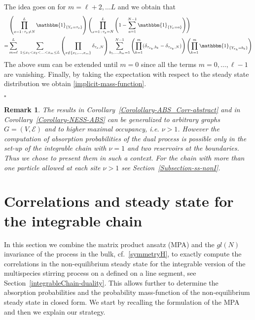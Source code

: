\documentclass[10pt]{article}
\numberwithin{equation}{section}
\numberwithin{equation}{subsection}
\newtheorem{remark}{Remark}
\begin{document}
{	The idea goes on for $m=\ell+2,\ldots L$ and we obtain that 
\begin{align}
&\left(\prod_{x=1\,:\,\tau_{x}\neq N}^{L}\mathbbm{1}_{\{Y_x=\tau_{x}\}}\right)\left(\prod_{x=1\,:\,\tau_{x}=N}^{L}\left(1-\sum_{a=1}^{N-1}\mathbbm{1}_{\{Y_x=a\}}\right)\right)\nonumber\\
=&
\sum_{m=\ell}^{L}\;\sum_{1\leq x_{1}<x_{2}<\ldots<x_{m}\leq L}\left(\prod_{x\notin\{x_{1},\ldots,x_{m}\}}\delta_{\tau_{x},N}\right)\sum_{b_{1},\ldots,b_{m}=1}^{N-1}\left(\prod_{k=1}^{m}(\delta_{\tau_{x_{k}},b_{k}}-\delta_{\tau_{x_{k}},N})\right)\left(\prod_{k=1}^{m}\mathbbm{1}_{\{Y_{x_{k}}=b_{k}\}}\right)
\end{align}
The above sum can be extended until $m=0$ since all the terms $m=0,\ldots,\ell-1$ are vanishing. 
Finally, by taking the expectation with respect to the steady state distribution we obtain \eqref{implicit-mass-function}.}  %
\begin{flushright}
	$\square$
\end{flushright}
\begin{remark}\label{Remark-extension-graph-nu}
	The results in Corollary~\ref{Corolollary-ABS_Corr-abstract} and in Corollary~\ref{Corollary-NESS-ABS}  can be generalized to arbitrary graphs $G=(V,\mathcal{E})$ and to {higher maximal occupancy}, i.e. $\nu >1$.
	However the computation of absorption probabilities of the dual process is possible only in the set-up of the integrable chain with $\nu =1$ and two reservoirs at the boundaries.
	Thus we chose to present them in such a context. For the chain with {more than one particle allowed at each site} $\nu >1$ see Section~\ref{Subsection-ss-nonI}.
\end{remark}





\section{Correlations and steady state  for the integrable chain}\label{sectionIntegrabiliy}
In this section we combine the matrix product ansatz (MPA) \cite{vanicat2017exact} and  the $gl(N)$ invariance of the process in the bulk, cf.~\eqref{symmetryH}, to exactly compute the correlations in the non-equilibrium steady state
 for the integrable version of the multispecies stirring process on a defined on a line segment, see Section~\ref{integrableChain-duality}. 
This allows further to determine the absorption probabilities and the probability mass-function of the non-equilibrium steady state in closed form.
We start by recalling the formulation of the MPA  and then we explain our strategy.
\end{document}
